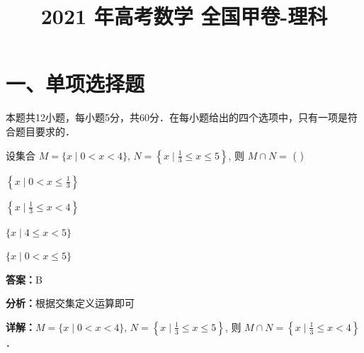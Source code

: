 ﻿\title{2021 年高考数学 全国甲卷-理科}
\date{}
\maketitle

\section*{一、单项选择题}
本题共12小题，每小题5分，共60分．在每小题给出的四个选项中，只有一项是符合题目要求的．

\begin{question}[points=5]
设集合 $M = \{x \mid 0 < x < 4\}$, $N = \left\{x \mid \frac{1}{3} \le x \le 5\right\}$, 则 $M \cap N =$ ( )
\begin{choices}
  \item $\left\{x \mid 0 < x \le \frac{1}{3}\right\}$
  \item $\left\{x \mid \frac{1}{3} \le x < 4\right\}$
  \item $\{x \mid 4 \le x < 5\}$
  \item $\{x \mid 0 < x \le 5\}$
\end{choices}
\begin{solution}
\textbf{答案：}B

\textbf{分析：}根据交集定义运算即可

\textbf{详解：}$M = \{x \mid 0 < x < 4\}$, $N = \left\{x \mid \frac{1}{3} \le x \le 5\right\}$, 则 $M \cap N = \left\{x \mid \frac{1}{3} \le x < 4\right\}$．
\end{solution}
\end{question}

